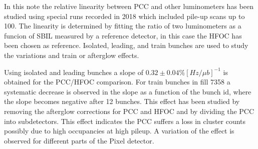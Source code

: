 In this note the relative linearity between PCC and other luminometers has been studied using special runs recorded in 2018 which included pile-up scans up to 100.
The linearity is determined by fitting the ratio of two luminometers as a funcion of SBIL measured by a reference detector, in this case the HFOC has been chosen as reference.
Isolated, leading, and train bunches are used to study the variations and train or afterglow effects.

Using isolated and leading bunches a slope of $0.32\pm0.04 \% [Hz/\mu b]^{-1}$ is obtained for the PCC/HFOC comparison.
For train bunches in fill 7358 a systematic decrease is observed in the slope as a function of the bunch id, where the slope becomes negative after 12 bunches.
This effect has been studied by removing the afterglow corrections for PCC and HFOC and by dividing the PCC into subdetectors.
This effect indicates the PCC suffers a loss in cluster counts possibly due to high occupancies at high pileup. 
A variation of the effect is observed for different parts of the Pixel detector.
